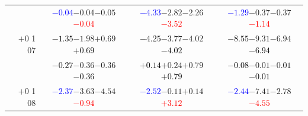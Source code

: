 \documentclass[compress]{beamer}
\begin{document}
\begin{frame}
\begin{tabular}{r | c | c | c}
          & \textcolor{blue}{$-0.04$}\hspace{0.1 cm}$-0.04$\hspace{0.1 cm}$-0.05$\hspace{0.1 cm}\textcolor{red}{$-0.04$} & \textcolor{blue}{$-4.33$}\hspace{0.1 cm}$-2.82$\hspace{0.1 cm}$-2.26$\hspace{0.1 cm}\textcolor{red}{$-3.52$} & \textcolor{blue}{$-1.29$}\hspace{0.1 cm}$-0.37$\hspace{0.1 cm}$-0.37$\hspace{0.1 cm}\textcolor{red}{$-1.14$} \\
$+$0 1 07 & \textcolor{black}{$-1.35$}\hspace{0.1 cm}$-1.98$\hspace{0.1 cm}$+0.69$\hspace{0.1 cm}\textcolor{black}{$+0.69$} & \textcolor{black}{$-4.25$}\hspace{0.1 cm}$-3.77$\hspace{0.1 cm}$-4.02$\hspace{0.1 cm}\textcolor{black}{$-4.02$} & \textcolor{black}{$-8.55$}\hspace{0.1 cm}$-9.31$\hspace{0.1 cm}$-6.94$\hspace{0.1 cm}\textcolor{black}{$-6.94$} \\
          & \textcolor{black}{$-0.27$}\hspace{0.1 cm}$-0.36$\hspace{0.1 cm}$-0.36$\hspace{0.1 cm}\textcolor{black}{$-0.36$} & \textcolor{black}{$+0.14$}\hspace{0.1 cm}$+0.24$\hspace{0.1 cm}$+0.79$\hspace{0.1 cm}\textcolor{black}{$+0.79$} & \textcolor{black}{$-0.08$}\hspace{0.1 cm}$-0.01$\hspace{0.1 cm}$-0.01$\hspace{0.1 cm}\textcolor{black}{$-0.01$} \\
$+$0 1 08 & \textcolor{blue}{$-2.37$}\hspace{0.1 cm}$-3.63$\hspace{0.1 cm}$-4.54$\hspace{0.1 cm}\textcolor{red}{$-0.94$} & \textcolor{blue}{$-2.52$}\hspace{0.1 cm}$-0.11$\hspace{0.1 cm}$+0.14$\hspace{0.1 cm}\textcolor{red}{$+3.12$} & \textcolor{blue}{$-2.44$}\hspace{0.1 cm}$-7.41$\hspace{0.1 cm}$-2.78$\hspace{0.1 cm}\textcolor{red}{$-4.55$} \\

\end{tabular}
\end{frame}
\end{document}
